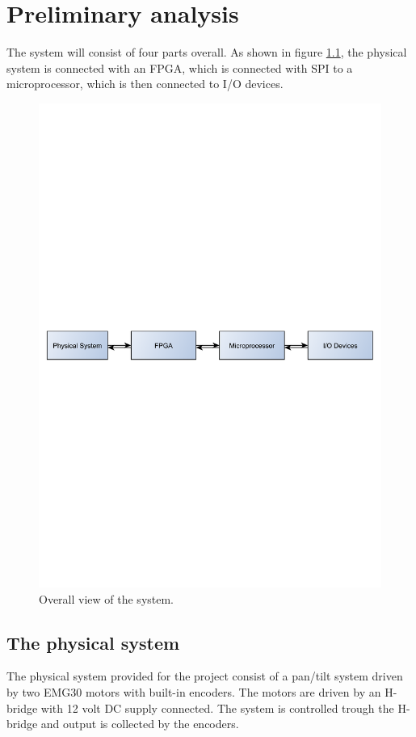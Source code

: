 


\chapter{Preliminary analysis}
The system will consist of four parts overall. As shown in figure \ref{fig:firstsystem}, the physical system is connected with an FPGA, which is connected with SPI to a microprocessor,  which is then connected to I/O devices.

\begin{figure}[htb]
\centering
\includegraphics[scale=0.56,trim=400 380 400 380]{graphics/firstsystem.pdf} %
\caption{Overall view of the system.}
\label{fig:firstsystem}	
\end{figure}

\section{The physical system}\label{sec:physicalsystem}
The physical system provided for the project consist of a pan/tilt system driven by two EMG30 \cite{emg30} motors with built-in encoders. The motors are driven by an H-bridge \cite{hbridge} with 12 volt DC supply connected. The system is controlled trough the H-bridge and output is collected by the encoders.

